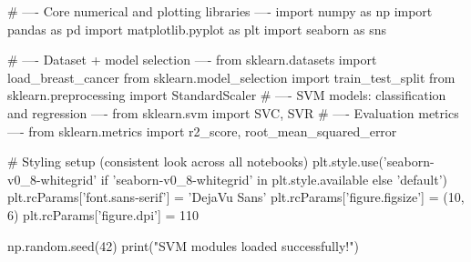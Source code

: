
\begin{codebox}[title={Core numerical and plotting libraries}]
# ---- Core numerical and plotting libraries ----
import numpy as np
import pandas as pd
import matplotlib.pyplot as plt
import seaborn as sns

# ---- Dataset + model selection ----
from sklearn.datasets import load_breast_cancer
from sklearn.model_selection import train_test_split
from sklearn.preprocessing import StandardScaler
# ---- SVM models: classification and regression ----
from sklearn.svm import SVC, SVR
# ---- Evaluation metrics ----
from sklearn.metrics import r2_score, root_mean_squared_error

# Styling setup (consistent look across all notebooks)
plt.style.use('seaborn-v0_8-whitegrid' if 'seaborn-v0_8-whitegrid' in plt.style.available else 'default')
plt.rcParams['font.sans-serif'] = 'DejaVu Sans'
plt.rcParams['figure.figsize'] = (10, 6)
plt.rcParams['figure.dpi'] = 110

np.random.seed(42)
print("SVM modules loaded successfully!")
\end{codebox}

